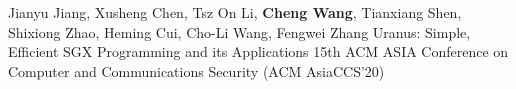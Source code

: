 \cvpub
{Jianyu Jiang, Xusheng Chen, Tsz On Li, \textbf{Cheng Wang}, Tianxiang Shen, Shixiong Zhao, Heming Cui, Cho-Li Wang, Fengwei Zhang} %
{Uranus: Simple, Efficient SGX Programming and its Applications} %
{} %
{} %
{ %
15th ACM ASIA Conference on Computer and Communications Security (ACM AsiaCCS'20)\newline
}
